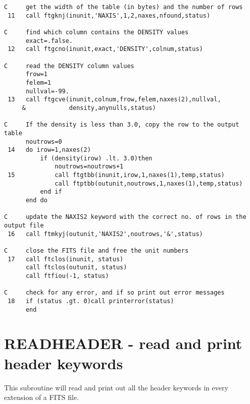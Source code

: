 \newpage
\small
\begin{verbatim}
C     get the width of the table (in bytes) and the number of rows
 11   call ftgknj(inunit,'NAXIS',1,2,naxes,nfound,status)

C     find which column contains the DENSITY values
      exact=.false.
 12   call ftgcno(inunit,exact,'DENSITY',colnum,status)

C     read the DENSITY column values
      frow=1
      felem=1
      nullval=-99.
 13   call ftgcve(inunit,colnum,frow,felem,naxes(2),nullval,
     &            density,anynulls,status)

C     If the density is less than 3.0, copy the row to the output table
      noutrows=0
 14   do irow=1,naxes(2)
          if (density(irow) .lt. 3.0)then
              noutrows=noutrows+1
 15           call ftgtbb(inunit,irow,1,naxes(1),temp,status)
              call ftptbb(outunit,noutrows,1,naxes(1),temp,status)
          end if
      end do

C     update the NAXIS2 keyword with the correct no. of rows in the output file
 16   call ftmkyj(outunit,'NAXIS2',noutrows,'&',status)

C     close the FITS file and free the unit numbers
 17   call ftclos(inunit, status)
      call ftclos(outunit, status)
      call ftfiou(-1, status)

C     check for any error, and if so print out error messages
 18   if (status .gt. 0)call printerror(status)
      end
\end{verbatim}
\normalsize
\newpage
\section{READHEADER - read and print header keywords}

This subroutine will read and print out all the header keywords in every
extension of a FITS file.

